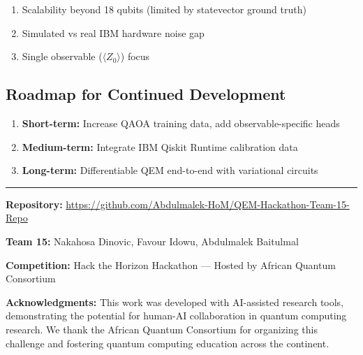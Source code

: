 \documentclass[11pt, a4paper]{article}
\begin{document}
\begin{enumerate}
    \item Scalability beyond 18 qubits (limited by statevector ground truth)
    \item Simulated vs real IBM hardware noise gap
    \item Single observable ($\langle Z_0 \rangle$) focus
\end{enumerate}

\subsection{Roadmap for Continued Development}

\begin{enumerate}
    \item \textbf{Short-term:} Increase QAOA training data, add observable-specific heads
    \item \textbf{Medium-term:} Integrate IBM Qiskit Runtime calibration data
    \item \textbf{Long-term:} Differentiable QEM end-to-end with variational circuits
\end{enumerate}

\vspace{1cm}
\hrule
\vspace{0.5cm}
\textbf{Repository:} \url{https://github.com/Abdulmalek-HoM/QEM-Hackathon-Team-15-Repo}

\textbf{Team 15:} Nakahosa Dinovic, Favour Idowu, Abdulmalek Baitulmal

\textbf{Competition:} Hack the Horizon Hackathon --- Hosted by African Quantum Consortium

\textbf{Acknowledgments:} This work was developed with AI-assisted research tools, demonstrating the potential for human-AI collaboration in quantum computing research. We thank the African Quantum Consortium for organizing this challenge and fostering quantum computing education across the continent.
\end{document}
